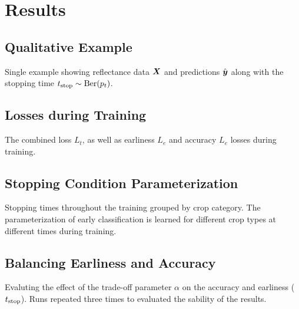 \documentclass[a0]{tumposter}
\begin{document}
\begin{minipage}[t]{.32\textwidth}
	\section{Results}
	
	\subsection{Qualitative Example} \par
	{\footnotesize Single example showing reflectance data $\M{x}$ and predictions $\yhat$ along with the stopping time $t_\text{stop} \sim \text{Ber}(p_t)$. \par}
	
	\vspace{.5em}
	
	\vspace{-.5em}
	
	\subsection{Losses during Training} \par
	{\footnotesize The combined loss $L_t$, as well as earliness $L_e$ and accuracy $L_e$ losses during training. \par}

	\vspace{.5em}	
	
	\vspace{-1em}

	\subsection{Stopping Condition Parameterization} \par
	{\footnotesize Stopping times throughout the training grouped by crop category. The parameterization of early classification is learned for different crop types at different times during training. \par}
	
	
	
	\subsection{Balancing Earliness and Accuracy} \par
	{\footnotesize Evaluting the effect of the trade-off parameter $\alpha$ on the accuracy and earliness ($t_\text{stop}$). Runs repeated three times to evaluated the sability of the results. \par}
	

\end{minipage}
\end{document}
